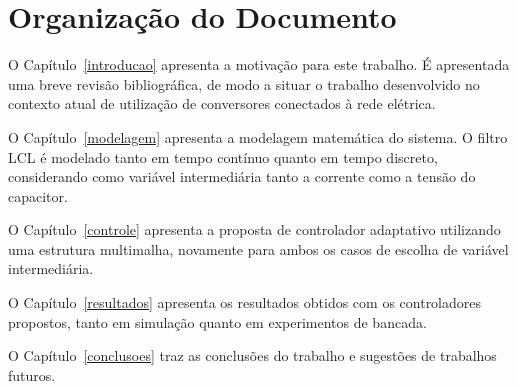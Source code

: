 \section{Organização do Documento}

	O Capítulo~\ref{introducao} apresenta a motivação para este trabalho. É apresentada uma breve revisão bibliográfica, de modo a situar o trabalho desenvolvido no contexto atual de utilização de conversores conectados à rede elétrica.

	O Capítulo~\ref{modelagem} apresenta a modelagem matemática do sistema. O filtro LCL é modelado tanto em tempo contínuo quanto em tempo discreto, considerando como variável intermediária tanto a corrente como a tensão do capacitor.

	O Capítulo~\ref{controle} apresenta a proposta de controlador adaptativo utilizando uma estrutura multimalha, novamente para ambos os casos de escolha de variável intermediária.

	O Capítulo~\ref{resultados} apresenta os resultados obtidos com os controladores propostos, tanto em simulação quanto em experimentos de bancada.

	O Capítulo~\ref{conclusoes} traz as conclusões do trabalho e sugestões de trabalhos futuros.


